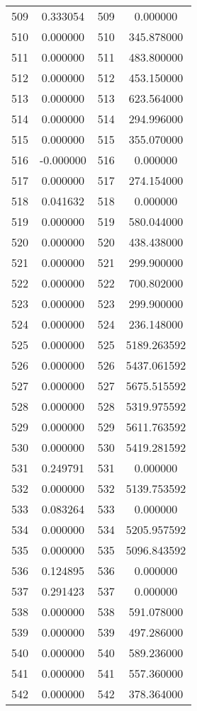 \documentclass[12pt]{article}
\begin{document}
\begin{longtable}{@{}cccc@{}}
509 & 0.333054 & 509 & 0.000000 \\
510 & 0.000000 & 510 & 345.878000 \\
511 & 0.000000 & 511 & 483.800000 \\
512 & 0.000000 & 512 & 453.150000 \\
513 & 0.000000 & 513 & 623.564000 \\
514 & 0.000000 & 514 & 294.996000 \\
515 & 0.000000 & 515 & 355.070000 \\
516 & -0.000000 & 516 & 0.000000 \\
517 & 0.000000 & 517 & 274.154000 \\
518 & 0.041632 & 518 & 0.000000 \\
519 & 0.000000 & 519 & 580.044000 \\
520 & 0.000000 & 520 & 438.438000 \\
521 & 0.000000 & 521 & 299.900000 \\
522 & 0.000000 & 522 & 700.802000 \\
523 & 0.000000 & 523 & 299.900000 \\
524 & 0.000000 & 524 & 236.148000 \\
525 & 0.000000 & 525 & 5189.263592 \\
526 & 0.000000 & 526 & 5437.061592 \\
527 & 0.000000 & 527 & 5675.515592 \\
528 & 0.000000 & 528 & 5319.975592 \\
529 & 0.000000 & 529 & 5611.763592 \\
530 & 0.000000 & 530 & 5419.281592 \\
531 & 0.249791 & 531 & 0.000000 \\
532 & 0.000000 & 532 & 5139.753592 \\
533 & 0.083264 & 533 & 0.000000 \\
534 & 0.000000 & 534 & 5205.957592 \\
535 & 0.000000 & 535 & 5096.843592 \\
536 & 0.124895 & 536 & 0.000000 \\
537 & 0.291423 & 537 & 0.000000 \\
538 & 0.000000 & 538 & 591.078000 \\
539 & 0.000000 & 539 & 497.286000 \\
540 & 0.000000 & 540 & 589.236000 \\
541 & 0.000000 & 541 & 557.360000 \\
542 & 0.000000 & 542 & 378.364000 \\

\end{longtable}
\end{document}
